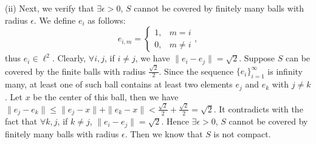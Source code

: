 \documentclass[12pt,a4paper]{ctexart}
\begin{document}
(ii) Next, we verify that $\exists \epsilon > 0$, $S$ cannot be covered by finitely many balls with radius $\epsilon$. We define $e_{i}$ as follows:
\begin{equation*}
e_{i,m} =
\left\{
             \begin{array}{cl}
             1, & m = i \\
             0, & m \neq i
             \end{array},
\right.
\end{equation*}
thus $e_{i} \in \ell^{2}$. Clearly, $\forall i, j$, if $i \neq j$,  we have  $\|e_{i} - e_{j} \| = \sqrt{2}$. Suppose $S$ can be covered by the finite balls with radius $\frac{\sqrt{2}}{2}$. Since the sequence $\{e_{i}\}_{i = 1}^{\infty}$ is infinity many, at least one of such ball contains at least two elements $e_{j}$ and $e_{k}$ with $j \neq k$. Let $x$ be the center of this ball, then we have $\|e_{j}  - e_{k}\| \leq \|e_{j} - x\| + \|e_{k} - x\| < \frac{\sqrt{2}}{2} + \frac{\sqrt{2}}{2} =  \sqrt{2}$. It contradicts with the fact that $\forall k, j$, if $k \neq j$, $\|e_{i} - e_{j} \| = \sqrt{2}$. Hence $\exists \epsilon > 0$, $S$ cannot be covered by finitely many balls with radius $\epsilon$. Then we know  that $S$ is  not compact.
\end{document}

